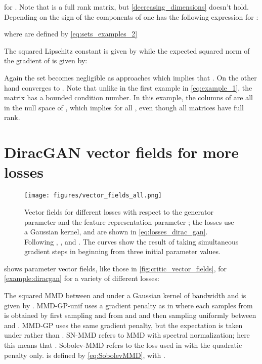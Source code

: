 \documentclass{article}
\begin{document}
for . Note that  is a full rank matrix, but \cref{decreasing_dimensions} doesn't hold. Depending on the sign of the components of  one has the following expression for :

where  are defined by \cref{eq:sets_examples_2}


The squared Lipschitz constant is given by  while the expected squared norm of the gradient of  is given by:

Again the set  becomes negligible as  approaches  which implies that  . On the other hand  converges to .  Note that unlike in the first example in \cref{eq:example_1}, the matrix  has a bounded condition number. In this example, the columns of   are all in the null space of , which implies  for all , even though all matrices have full rank.


\section{DiracGAN vector fields for more losses} \label{appendix:diracgan-full}
\begin{figure}[ht]
\centering
   \texttt{[image: figures/vector\_fields\_all.png]}
    \caption{Vector fields for different losses with respect to the generator parameter  and the feature representation parameter ;
    the losses use a Gaussian kernel, and are shown in \eqref{eq:losses_dirac_gan}.
    Following \cite{Mescheder:2018}, ,  and .
    The curves show the result of taking simultaneous gradient steps in 
    beginning from three initial parameter values.}
    \label{fig:vector_fields_all}
\end{figure}
 shows parameter vector fields, like those in \cref{fig:critic_vector_fields}, for \cref{example:diracgan}
for a variety of different losses:

The squared MMD between  and  under a Gaussian kernel of bandwidth  and is given by .
MMD-GP-unif uses a gradient penalty as in \cite{Binkowski:2018} where each samples from  is obtained by first sampling  and  from  and  and then sampling uniformly between  and .
MMD-GP uses the same gradient penalty, but the expectation is taken under  rather than .
SN-MMD refers to MMD with spectral normalization; here this means that .
Sobolev-MMD refers to the loss used in \cite{sobolev-gan} with the quadratic penalty only.
 is defined by \cref{eq:SobolevMMD}, with .
\end{document}
